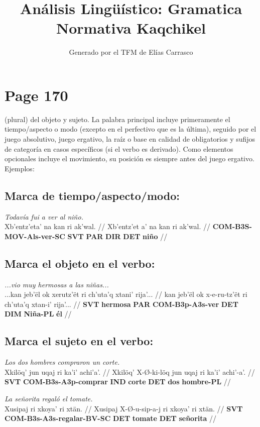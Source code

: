 \documentclass{article}%
\title{Análisis Lingüístico: Gramatica Normativa Kaqchikel}%
\author{Generado por el TFM de Elías Carrasco}%
\begin{document}
%
\normalsize%
\maketitle%
\section{Page 170}%
\label{sec:Page170}%
(plural) del objeto y sujeto. La palabra principal incluye primeramente el tiempo/aspecto %
o modo (excepto en el perfectivo que es la última), seguido por el juego absolutivo, %
juego ergativo, la raíz o base en calidad de obligatorios y sufijos de categoría en casos %
específicos (si el verbo es derivado). Como elementos opcionales incluye el movimiento, %
su posición es siempre antes del juego ergativo. Ejemplos: %
\subsection{Marca de tiempo/aspecto/modo:}%
\label{subsec:Marcadetiempo/aspecto/modo}%

%
\par\medskip%
\ex
\textit{Todavía fui a ver al niño.} \\
\begingl
\gla Xb'entz'eta' na kan ri ak'wal. //
\glb Xb'entz'et a' na kan ri ak'wal. //
\glc \textbf{COM-B3S-MOV-Als-ver-SC} \textbf{SVT} \textbf{PAR} \textbf{DIR} \textbf{DET} \textbf{niño} //
\endgl
\xe
%
\medskip%
\subsection{Marca el objeto en el verbo:}%
\label{subsec:Marcaelobjetoenelverbo}%

%
\par\medskip%
\ex
\textit{...vio muy hermosas a las niñas...} \\
\begingl
\gla ...kan jeb'ël ok xerutz'ët ri ch'uta'q xtani' rija'... //
\glb kan jeb'ël ok x-e-ru-tz'ët ri ch'uta'q xtan-i' rija'... //
\glc \textbf{SVT} \textbf{hermosa} \textbf{PAR} \textbf{COM-B3p-A3s-ver} \textbf{DET} \textbf{DIM} \textbf{Niña-PL} \textbf{él} //
\endgl
\xe
%
\medskip%
\subsection{Marca el sujeto en el verbo:}%
\label{subsec:Marcaelsujetoenelverbo}%

%
\par\medskip%
\ex
\textit{Los dos hombres compraron un corte.} \\
\begingl
\gla Xkilöq' jun uqaj ri ka'i' achi'a'. //
\glb Xkilöq' X-Ø-ki-löq jun uqaj ri ka'i' achi'-a'. //
\glc \textbf{SVT} \textbf{COM-}\textbf{B3s-}\textbf{A3p-}\textbf{comprar} \textbf{IND} \textbf{corte} \textbf{DET} \textbf{dos} \textbf{hombre-PL} //
\endgl
\xe
%
\medskip%
\par\medskip%
\ex
\textit{La señorita regaló el tomate.} \\
\begingl
\gla Xusipaj ri xkoya' ri xtän. //
\glb Xusipaj X-Ø-u-sip-a-j ri xkoya' ri xtän. //
\glc \textbf{SVT} \textbf{COM-}\textbf{B3s-}\textbf{A3s-}\textbf{regalar-}\textbf{BV-}\textbf{SC} \textbf{DET} \textbf{tomate} \textbf{DET} \textbf{señorita} //
\endgl
\xe
%
\medskip%
\end{document}
